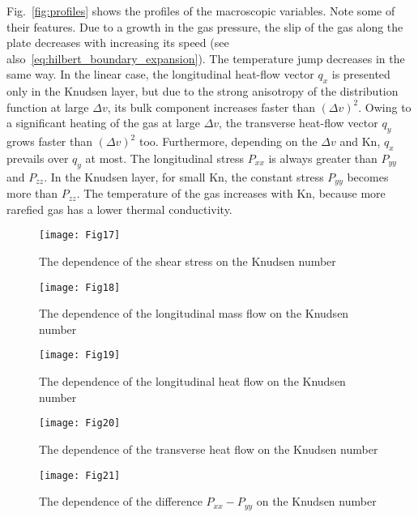 \documentclass[aip,pof,preprint]{revtex4-1}
\newcommand{\Kn}{\mathrm{Kn}}
\begin{document}
Fig.~\ref{fig:profiles} shows the profiles of the macroscopic variables.
Note some of their features.
Due to a growth in the gas pressure, the slip of the gas along the plate decreases
with increasing its speed (see also~\eqref{eq:hilbert_boundary_expansion}).
The temperature jump decreases in the same way.
In the linear case, the longitudinal heat-flow vector \(q_x\) is presented only in the Knudsen layer,
but due to the strong anisotropy of the distribution function at large \(\Delta{v}\),
its bulk component increases faster than \((\Delta{v})^2\).
Owing to a significant heating of the gas at large \(\Delta{v}\),
the transverse heat-flow vector \(q_y\) grows faster than \((\Delta{v})^2\) too.
Furthermore, depending on the \(\Delta{v}\) and \(\Kn\), \(q_x\) prevails over \(q_y\) at most.
The longitudinal stress \(P_{xx}\) is always greater than \(P_{yy}\) and \(P_{zz}\).
In the Knudsen layer, for small \(\Kn\), the constant stress \(P_{yy}\) becomes more than \(P_{zz}\).
The temperature of the gas increases with \(\Kn\), because more rarefied gas
has a lower thermal conductivity.

\begin{figure}
    \centering
    \texttt{[image: Fig17]}
    \caption{The dependence of the shear stress on the Knudsen number}
    \label{fig:shear}
\end{figure}

\begin{figure}
    \centering
    \texttt{[image: Fig18]}
    \caption{The dependence of the longitudinal mass flow on the Knudsen number}
    \label{fig:flow}
\end{figure}

\begin{figure}
    \centering
    \texttt{[image: Fig19]}
    \caption{The dependence of the longitudinal heat flow on the Knudsen number}
    \label{fig:qflow}
\end{figure}

\begin{figure}
    \centering
    \texttt{[image: Fig20]}
    \caption{The dependence of the transverse heat flow on the Knudsen number}
    \label{fig:qflowy}
\end{figure}

\begin{figure}
    \centering
    \texttt{[image: Fig21]}
    \caption{The dependence of the difference \(P_{xx}-P_{yy}\) on the Knudsen number}
    \label{fig:pxx}
\end{figure}
\end{document}
